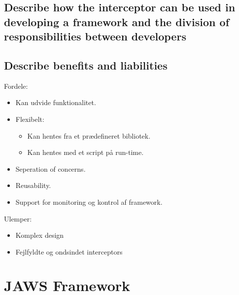 \documentclass{article}
\begin{document}
\subsection{Describe how the interceptor can be used in developing a framework and the division of responsibilities between developers}

\subsection{Describe benefits and liabilities}

Fordele:
\vspace{-10pt}
\begin{itemize}
	\item Kan udvide funktionalitet.
	\item Flexibelt:
	\begin{itemize}
	 	\item Kan hentes fra et prædefineret bibliotek.
	 	\item Kan hentes med et script på run-time.
	 \end{itemize} 
	\item Seperation of concerns.
	\item Reusability.
	\item Support for monitoring og kontrol af framework.
\end{itemize}

Ulemper:
\vspace{-10pt}
\begin{itemize}
	\item Komplex design
	\item Fejlfyldte og ondsindet interceptors
\end{itemize}




\newpage
\section{JAWS Framework}
\end{document}
